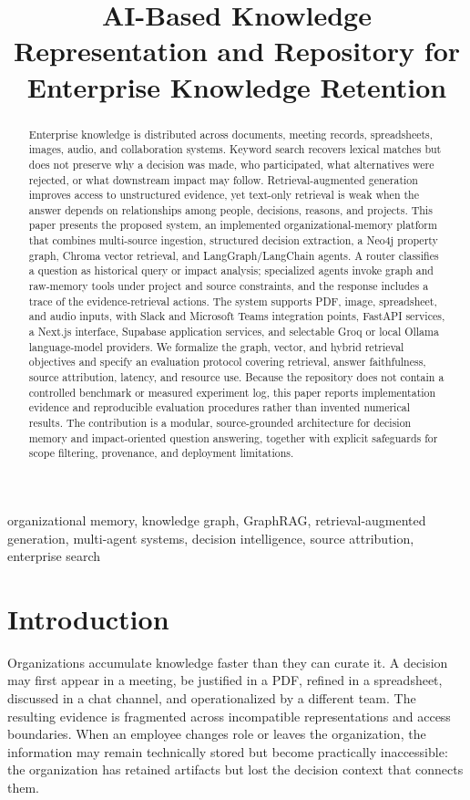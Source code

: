 \documentclass[conference]{IEEEtran}
\title{AI-Based Knowledge Representation and Repository for Enterprise Knowledge Retention}
\author{\IEEEauthorblockN{Atharva}
\IEEEauthorblockA{Independent Researcher\\
Pune, India\\
Author contact withheld for artifact preparation}}
\newcommand{\system}{the proposed system}
\begin{document}
\maketitle

\begin{abstract}
Enterprise knowledge is distributed across documents, meeting records, spreadsheets, images, audio, and collaboration systems. Keyword search recovers lexical matches but does not preserve why a decision was made, who participated, what alternatives were rejected, or what downstream impact may follow. Retrieval-augmented generation improves access to unstructured evidence, yet text-only retrieval is weak when the answer depends on relationships among people, decisions, reasons, and projects. This paper presents \system, an implemented organizational-memory platform that combines multi-source ingestion, structured decision extraction, a Neo4j property graph, Chroma vector retrieval, and LangGraph/LangChain agents. A router classifies a question as historical query or impact analysis; specialized agents invoke graph and raw-memory tools under project and source constraints, and the response includes a trace of the evidence-retrieval actions. The system supports PDF, image, spreadsheet, and audio inputs, with Slack and Microsoft Teams integration points, FastAPI services, a Next.js interface, Supabase application services, and selectable Groq or local Ollama language-model providers. We formalize the graph, vector, and hybrid retrieval objectives and specify an evaluation protocol covering retrieval, answer faithfulness, source attribution, latency, and resource use. Because the repository does not contain a controlled benchmark or measured experiment log, this paper reports implementation evidence and reproducible evaluation procedures rather than invented numerical results. The contribution is a modular, source-grounded architecture for decision memory and impact-oriented question answering, together with explicit safeguards for scope filtering, provenance, and deployment limitations.
\end{abstract}

\begin{IEEEkeywords}
organizational memory, knowledge graph, GraphRAG, retrieval-augmented generation, multi-agent systems, decision intelligence, source attribution, enterprise search
\end{IEEEkeywords}

\section{Introduction}
Organizations accumulate knowledge faster than they can curate it. A decision may first appear in a meeting, be justified in a PDF, refined in a spreadsheet, discussed in a chat channel, and operationalized by a different team. The resulting evidence is fragmented across incompatible representations and access boundaries. When an employee changes role or leaves the organization, the information may remain technically stored but become practically inaccessible: the organization has retained artifacts but lost the decision context that connects them.
\end{document}
